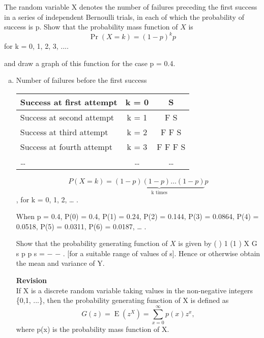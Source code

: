 \documentclass[a4paper,12pt]{article}
\begin{document}
\begin{framed}
\noindent The random variable X denotes the number of failures preceding the first
success in a series of independent Bernoulli trials, in each of which the
probability of success is p. Show that the probability mass function of $X$ is
\[{\displaystyle \Pr(X=k)=(1-p)^{k}p}\]
for k = 0, 1, 2, 3, .... 

and draw a graph of this function for the case p = 0.4.
\end{framed}

\begin{enumerate}[(a)]
\item Number of failures before the first
success

\begin{center}
\begin{tabular}{|l|c|c|} \hline 
Success at first attempt & k = 0 & S \\ \hline 
Success at second attempt & k = 1 & F S\\ \hline 
Success at third attempt & k = 2 & F F S\\ \hline 
Success at fourth attempt & k = 3 & F F F S\\ \hline 
\ldots & \ldots  &\ldots  \\ \hline 
\end{tabular}
\end{center}


\[P(X = k) = \underbrace{(1 - p)(1 - p)…(1 - p) }_\text{ k times }  p\] , for k = 0, 1, 2, … .


  When p = 0.4, P(0) = 0.4, P(1) = 0.24, P(2) = 0.144, P(3) = 0.0864,
P(4) = 0.0518, P(5) = 0.0311, P(6) = 0.0187, … .

\newpage
\begin{framed}
Show that the probability generating function of $X$ is given by
( ) 1 (1 ) X
G s p
p s
=
− −
.
[for a suitable range of values of s].
Hence or otherwise obtain the mean and variance of Y.
\end{framed}
\begin{framed}
\noindent \textbf{Revision}\\
If X is a discrete random variable taking values in the non-negative integers \{0,1, ...\}, then the probability generating function of X is defined as \[{\displaystyle G(z)=\operatorname {E} (z^{X})=\sum _{x=0}^{\infty }p(x)z^{x},} \]
where p(x) is the probability mass function of X. 
\end{framed}


\end{enumerate}
\end{document}

